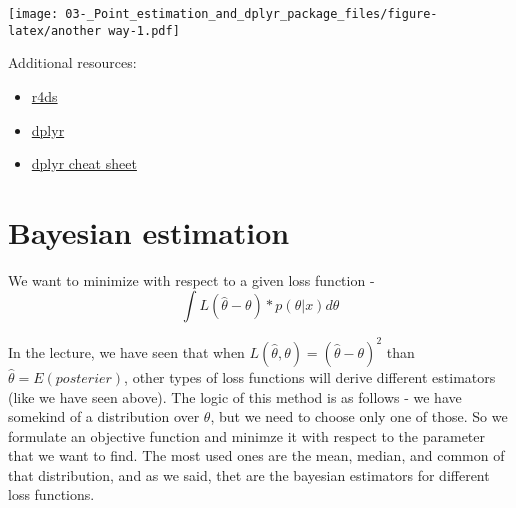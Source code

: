 \documentclass[]{article}
\providecommand{\tightlist}{%
  \setlength{\itemsep}{0pt}\setlength{\parskip}{0pt}}
\begin{document}
\texttt{[image: 03-\_Point\_estimation\_and\_dplyr\_package\_files/figure-latex/another way-1.pdf]}

Additional resources:

\begin{itemize}
\tightlist
\item
  \href{https://r4ds.had.co.nz/transform.html}{r4ds}
\item
  \href{https://dplyr.tidyverse.org/}{dplyr}
\item
  \href{https://github.com/rstudio/cheatsheets/blob/master/data-transformation.pdf}{dplyr
  cheat sheet}
\end{itemize}

\hypertarget{bayesian-estimation}{%
\section{Bayesian estimation}\label{bayesian-estimation}}

We want to minimize with respect to a given loss function -
\[\int L(\hat{\theta}- \theta)*p(\theta|x)d\theta\]

In the lecture, we have seen that when
\(L(\hat{\theta},\theta) = (\hat{\theta}- \theta)^2\) than
\(\hat{\theta} = E(posterier)\), other types of loss functions will
derive different estimators (like we have seen above). The logic of this
method is as follows - we have somekind of a distribution over
\(\theta\), but we need to choose only one of those. So we formulate an
objective function and minimze it with respect to the parameter that we
want to find. The most used ones are the mean, median, and common of
that distribution, and as we said, thet are the bayesian estimators for
different loss functions.
\end{document}
